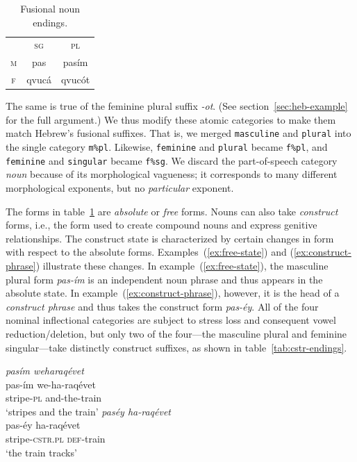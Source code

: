 {\begin{description}
   \begin{table}[t]
      \small
      \centering
       \setlength{\extrarowheight}{6pt}
      \begin{tabular}{ccc} 
 \toprule
 &  \textsc{sg} & \textsc{pl}\\
\cmidrule{2-3} 
\textsc{m} & pas & pas\'{i}m \\
\textsc{f}  &	qvuc\'{a}	& qvuc\'{o}t \\	
    \bottomrule
    \end{tabular}
    \label{tab:abs-only}
    \caption{Fusional noun endings.}
    \end{table}
 The same is true 
of the feminine plural suffix \textit{-ot}. (See section~\ref{sec:heb-example} for the full argument.)
We thus modify these atomic categories to make them match 
Hebrew's fusional suffixes. That is, we merged \texttt{masculine} 
and \texttt{plural} into the single category \texttt{m\%pl}. Likewise, 
\texttt{feminine} and \texttt{plural} became \texttt{f\%pl}, and \texttt{feminine} 
and \texttt{singular} became \texttt{f\%sg}.
We discard the part-of-speech category \emph{noun} because of its morphological vagueness; it corresponds to many different morphological exponents, but no \emph{particular} exponent.

\item[Construct State.]
The forms in table~\ref{tab:abs-only} are \emph{absolute} or \emph{free} forms. 
Nouns can also take \emph{construct} forms, i.e., the form used to create compound 
nouns and express genitive relationships. The construct state is characterized by 
certain changes in form with respect to the absolute forms. 
Examples~(\ref{ex:free-state}) and (\ref{ex:construct-phrase})
illustrate these changes.
In example~(\ref{ex:free-state}), the masculine plural form \textit{pas-\'{i}m} is an independent noun phrase 
and thus appears in the absolute state. In example~(\ref{ex:construct-phrase}), however, it is the head 
of a \emph{construct phrase} and thus takes the construct form \emph{pas-\'{e}y}. 
All of the four nominal inflectional categories are subject to stress loss and consequent 
vowel reduction/deletion, but only two of the four---the masculine plural and 
feminine singular---take distinctly construct suffixes, as shown in table~\ref{tab:cstr-endings}. 

\begin{exe}
\ex \textit{pas\'{i}m \quad weharaq\'{e}vet} \\ \label{ex:free-state}
pas-\'{i}m \quad we-ha-raq\'{e}vet \\
stripe-\textsc{pl} \quad and-the-train \\
`stripes and the train'
\ex \textit{pas\'{e}y \quad ha-raq\'{e}vet} \\ \label{ex:construct-phrase}
pas-\'{e}y \quad ha-raq\'{e}vet \\
stripe-\textsc{cstr.pl} \quad \textsc{def}-train \\
`the train tracks'
\end{exe}


\end{description}}
